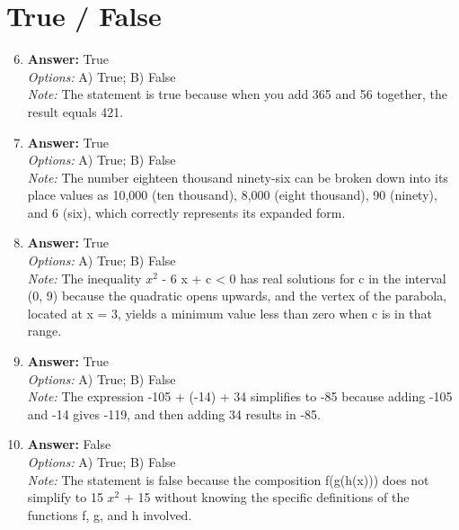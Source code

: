 \documentclass[12pt]{article}
\begin{document}
\section*{True / False}
\begin{enumerate}[label=\arabic*.]
\setcounter{enumi}{5}
\item \textbf{Answer:} True
\\ \textit{Options:} A) True; B) False
\\ \textit{Note:} The statement is true because when you add 365 and 56 together, the result equals 421.
\item \textbf{Answer:} True
\\ \textit{Options:} A) True; B) False
\\ \textit{Note:} The number eighteen thousand ninety-six can be broken down into its place values as 10,000 (ten thousand), 8,000 (eight thousand), 90 (ninety), and 6 (six), which correctly represents its expanded form.
\item \textbf{Answer:} True
\\ \textit{Options:} A) True; B) False
\\ \textit{Note:} The inequality $x^2$ - 6 x + c \textless{} 0 has real solutions for c in the interval (0, 9) because the quadratic opens upwards, and the vertex of the parabola, located at x = 3, yields a minimum value less than zero when c is in that range.
\item \textbf{Answer:} True
\\ \textit{Options:} A) True; B) False
\\ \textit{Note:} The expression -105 + (-14) + 34 simplifies to -85 because adding -105 and -14 gives -119, and then adding 34 results in -85.
\item \textbf{Answer:} False
\\ \textit{Options:} A) True; B) False
\\ \textit{Note:} The statement is false because the composition f(g(h(x))) does not simplify to 15 $x^2$ + 15 without knowing the specific definitions of the functions f, g, and h involved.
\end{enumerate}
\end{document}
